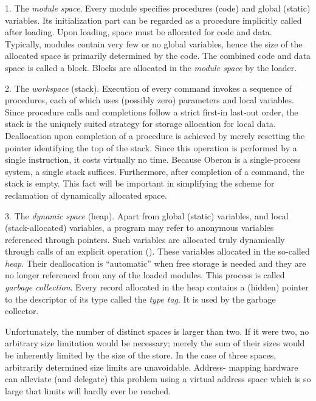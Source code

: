 1. The \emph{module space}. Every module specifies procedures (code) and global (static) variables. Its initialization part can be regarded as a procedure implicitly called after loading. Upon loading, space must be allocated for code and data. Typically, modules contain very few or no global variables, hence the size of the allocated space is primarily determined by the code. The combined code and data space is called a block. Blocks are allocated in the \emph{module space} by the loader.

2. The \emph{workspace} (stack). Execution of every command invokes a sequence of procedures, each of which uses (possibly zero) parameters and local variables. Since procedure calls and completions follow a strict first-in last-out order, the stack is the uniquely suited strategy for storage allocation for local data. Deallocation upon completion of a procedure is achieved by merely resetting the pointer identifying the top of the stack. Since this operation is performed by a single instruction, it costs virtually no time. Because Oberon is a single-process system, a single stack suffices. Furthermore, after completion of a command, the stack is empty. This fact will be important in simplifying the scheme for reclamation of dynamically allocated space.

3. The \emph{dynamic space} (heap). Apart from global (static) variables, and local (stack-allocated) variables, a program may refer to anonymous variables referenced through pointers. Such variables are allocated truly dynamically through calls of an explicit operation (). These variables  allocated in the so-called \emph{heap}. Their deallocation is ``automatic'' when free storage is needed and they are no longer referenced from any of the loaded modules. This process is called \emph{garbage collection}. Every record allocated in the heap contains a (hidden) pointer to the descriptor of its type called the \emph{type tag}. It is used by the garbage collector.

Unfortunately, the number of distinct spaces is larger than two. If it were two, no arbitrary size limitation would be necessary; merely the sum of their sizes would be inherently limited by the size of the store. In the case of three spaces, arbitrarily determined size limits are unavoidable. Address- mapping hardware can alleviate (and delegate) this problem using a virtual address space which is so large that limits will hardly ever be reached.

